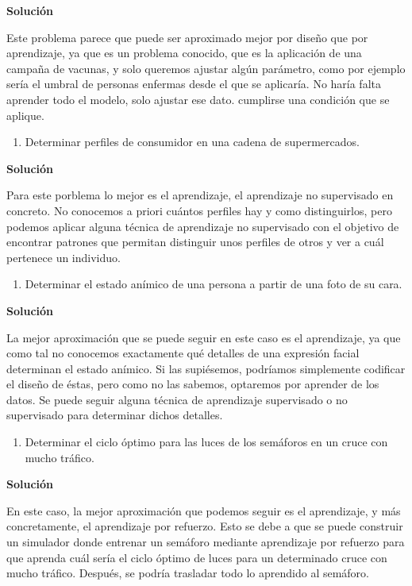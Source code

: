 \documentclass[11pt,a4paper]{article}
\newcommand{\answer}{\noindent\textbf{Solución}}
\begin{document}
\answer

Este problema parece que puede ser aproximado mejor por diseño que por aprendizaje, ya que es un problema conocido, que 
es la aplicación de una campaña de vacunas, y solo queremos ajustar algún parámetro, como por ejemplo sería el umbral de
personas enfermas desde el que se aplicaría. No haría falta aprender todo el modelo, solo ajustar ese dato.
cumplirse una condición que se aplique.

\begin{enumerate}[resume,label=\textit{\alph*})]
	\item Determinar perfiles de consumidor en una cadena de supermercados.
\end{enumerate}

\answer

Para este porblema lo mejor es el aprendizaje, el aprendizaje no supervisado en concreto. No conocemos a priori cuántos
perfiles hay y como distinguirlos, pero podemos aplicar alguna técnica de aprendizaje no supervisado con el objetivo de
encontrar patrones que permitan distinguir unos perfiles de otros y ver a cuál pertenece un individuo. 

\begin{enumerate}[resume,label=\textit{\alph*})]
	\item Determinar el estado anímico de una persona a partir de una foto de su cara.
\end{enumerate}

\answer

La mejor aproximación que se puede seguir en este caso es el aprendizaje, ya que como tal no conocemos exactamente
qué detalles de una expresión facial determinan el estado anímico. Si las supiésemos, podríamos simplemente codificar el
diseño de éstas, pero como no las sabemos, optaremos por aprender de los datos. Se puede seguir alguna técnica de aprendizaje
supervisado o no supervisado para determinar dichos detalles.

\begin{enumerate}[resume,label=\textit{\alph*})]
	\item Determinar el ciclo óptimo para las luces de los semáforos en un cruce con mucho tráfico.
\end{enumerate}

\answer

En este caso, la mejor aproximación que podemos seguir es el aprendizaje, y más concretamente, el aprendizaje por refuerzo.
Esto se debe a que se puede construir un simulador donde entrenar un semáforo mediante aprendizaje por refuerzo para que
aprenda cuál sería el ciclo óptimo de luces para un determinado cruce con mucho tráfico. Después, se podría trasladar
todo lo aprendido al semáforo.
\end{document}

